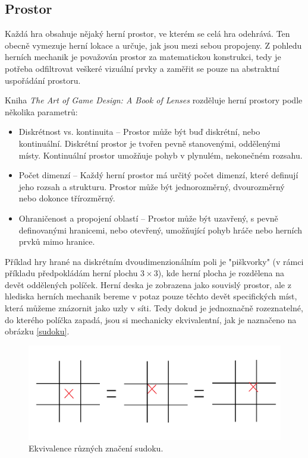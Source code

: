 \subsection{Prostor}

Každá hra obsahuje nějaký herní prostor, ve kterém se celá hra odehrává. Ten obecně vymezuje herní lokace a určuje, jak jsou mezi sebou propojeny. Z pohledu herních mechanik je považován prostor za matematickou konstrukci, tedy je potřeba odfiltrovat veškeré vizuální prvky a zaměřit se pouze na abstraktní uspořádání prostoru.

Kniha \textit{The Art of Game Design: A Book of Lenses} rozděluje herní prostory podle několika parametrů:

\begin{itemize}
    \item Diskrétnost vs. kontinuita -- Prostor může být buď diskrétní, nebo kontinuální. Diskrétní prostor je tvořen pevně stanovenými, oddělenými místy. Kontinuální prostor umožňuje pohyb v plynulém, nekonečném rozsahu.
    \item Počet dimenzí -- Každý herní prostor má určitý počet dimenzí, které definují jeho rozsah a strukturu. Prostor může být jednorozměrný, dvourozměrný nebo dokonce třírozměrný.
    \item Ohraničenost a propojení oblastí -- Prostor může být uzavřený, s pevně definovanými hranicemi, nebo otevřený, umožňující pohyb hráče nebo herních prvků mimo hranice.
\end{itemize}

Příklad hry hrané na diskrétním dvoudimenzionálním poli je "piškvorky" (v rámci příkladu předpokládám herní plochu $3\times3$), kde herní plocha je rozdělena na devět oddělených políček. Herní deska je zobrazena jako souvislý prostor, ale z hlediska herních mechanik bereme v potaz pouze těchto devět specifických míst, která můžeme znázornit jako uzly v síti. Tedy dokud je jednoznačně rozeznatelné, do kterého políčka zapadá, jsou si mechanicky ekvivalentní, jak je naznačeno na obrázku \vref{sudoku}.

\begin{figure}
  \centering      %
  \includegraphics[scale=0.3]{obr/sudoku.png} %
  \caption{Ekvivalence různých značení sudoku.} %
  \label{sudoku} %
\end{figure}

